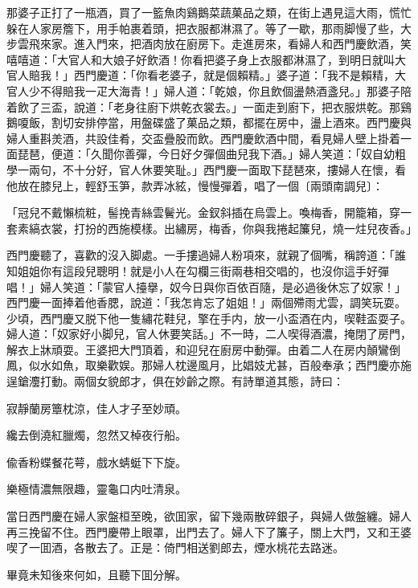 那婆子正打了一瓶酒，買了一籃魚肉鷄鵝菜蔬菓品之類，在街上遇見這大雨，慌忙躲在人家房簷下，用手帕裹着頭，把衣服都淋濕了。等了一歇，那雨脚慢了些，大步雲飛來家。進入門來，把酒肉放在廚房下。走進房來，看婦人和西門慶飲酒，笑嘻嘻道：「大官人和大娘子好飲酒！你看把婆子身上衣服都淋濕了，到明日就叫大官人賠我！」西門慶道：「你看老婆子，就是個賴精。」婆子道：「我不是賴精，大官人少不得賠我一疋大海青！」婦人道：「乾娘，你且飲個盪熱酒盞兒。」那婆子陪着飲了三盃，說道：「老身往廚下烘乾衣裳去。」一面走到廚下，把衣服烘乾。那鷄鵝嗄飯，割切安排停當，用盤碟盛了菓品之類，都擺在房中，盪上酒來。西門慶與婦人重斟羙酒，共設佳肴，交盃疊股而飲。西門慶飲酒中間，看見婦人壁上掛着一面琵琶，便道：「久聞你善彈，今日好夕彈個曲兒我下酒。」婦人笑道：「奴自幼粗學一兩句，不十分好，官人休要笑耻。」西門慶一面取下琵琶來，摟婦人在懷，看他放在膝兒上，輕舒玉笋，款弄冰絃，慢慢彈着，唱了一個〔兩頭南調兒〕：
\begin{myquote}
「冠兒不戴懶梳粧，髻挽青絲雲鬢光。金釵斜插在烏雲上。喚梅香，開籠箱，穿一套素縞衣裳，打扮的西施模樣。出繡房，梅香，你與我捲起簾兒，燒一炷兒夜香。」
\end{myquote}

西門慶聽了，喜歡的沒入脚處。一手摟過婦人粉項來，就親了個嘴，稱誇道：「誰知姐姐你有這段兒聰明！就是小人在勾欄三街兩巷相交唱的，也沒你這手好彈唱！」婦人笑道：「蒙官人擡擧，奴今日與你百依百隨，是必過後休忘了奴家！」西門慶一面捧着他香腮，說道：「我怎肯忘了姐姐！」兩個殢雨尤雲，調笑玩耍。少頃，西門慶又脱下他一隻繡花鞋兒，擎在手内，放一小盃酒在内，喫鞋盃耍子。婦人道：「奴家好小脚兒，官人休要笑話。」不一時，二人喫得酒濃，掩閉了房門，解衣上牀頑耍。王婆把大門頂着，和迎兒在廚房中動彈。由着二人在房内顛鸞倒鳳，似水如魚，取樂歡娱。那婦人枕邊風月，比娼妓尤甚，百般奉承；西門慶亦施逞鎗灋打動。兩個女貌郎才，俱在妙齡之際。有詩單道其態，詩曰：
\begin{myquote}
寂靜蘭房簟枕涼，佳人才子至妙頑。

纔去倒澆紅臘燭，忽然又棹夜行船。

偸香粉蝶餐花萼，戲水蜻蜓下下旋。

樂極情濃無限趣，靈龜口内吐清泉。
\end{myquote}

當日西門慶在婦人家盤桓至晚，欲囬家，留下幾兩散碎銀子，與婦人做盤纏。婦人再三挽留不住。西門慶帶上眼罩，出門去了。婦人下了簾子，關上大門，又和王婆喫了一囬酒，各散去了。正是：倚門相送劉郎去，煙水桃花去路迷。

畢竟未知後來何如，且聽下囬分解。

